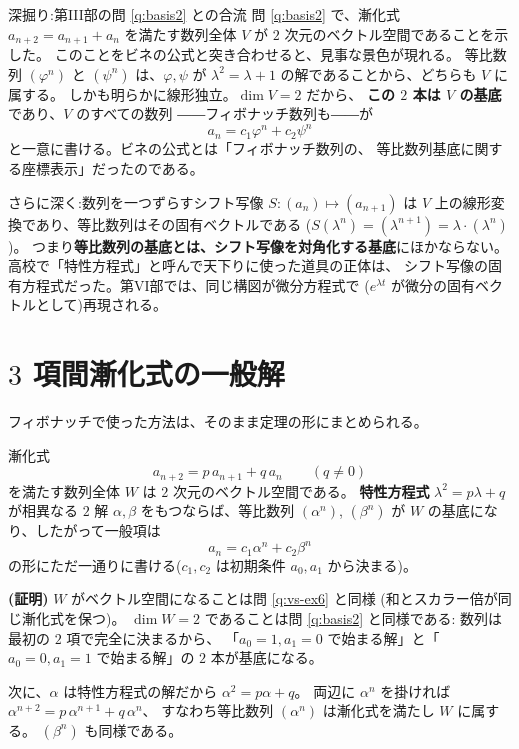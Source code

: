 \begin{itembox}[l]{深掘り:第III部の問 \ref{q:basis2} との合流}
問 \ref{q:basis2} で、漸化式 $a_{n+2} = a_{n+1} + a_n$ を満たす数列全体 $V$ が
$2$ 次元のベクトル空間であることを示した。
このことをビネの公式と突き合わせると、見事な景色が現れる。
等比数列 $(\varphi^n)$ と $(\psi^n)$ は、$\varphi, \psi$ が
$\lambda^2 = \lambda + 1$ の解であることから、どちらも $V$ に属する。
しかも明らかに線形独立。$\dim V = 2$ だから、
\textbf{この $2$ 本は $V$ の基底}であり、$V$ のすべての数列
――フィボナッチ数列も――が
\[
a_n = c_1 \varphi^n + c_2 \psi^n
\]
と一意に書ける。ビネの公式とは「フィボナッチ数列の、
等比数列基底に関する座標表示」だったのである。

さらに深く:数列を一つずらすシフト写像 $S : (a_n) \mapsto (a_{n+1})$ は
$V$ 上の線形変換であり、等比数列はその固有ベクトルである
($S(\lambda^n) = (\lambda^{n+1}) = \lambda \cdot (\lambda^n)$)。
つまり\textbf{等比数列の基底とは、シフト写像を対角化する基底}にほかならない。
高校で「特性方程式」と呼んで天下りに使った道具の正体は、
シフト写像の固有方程式だった。第VI部では、同じ構図が微分方程式で
($e^{\lambda t}$ が微分の固有ベクトルとして)再現される。
\end{itembox}

\section{$3$ 項間漸化式の一般解}

フィボナッチで使った方法は、そのまま定理の形にまとめられる。

\begin{teiri}[$3$ 項間漸化式の一般項]\label{thm:power-rec}
漸化式
\[
a_{n+2} = p\,a_{n+1} + q\,a_n \qquad (q \neq 0)
\]
を満たす数列全体 $W$ は $2$ 次元のベクトル空間である。
\textbf{特性方程式} $\lambda^2 = p\lambda + q$ が相異なる $2$ 解
$\alpha, \beta$ をもつならば、等比数列 $(\alpha^n)$, $(\beta^n)$ が
$W$ の基底になり、したがって一般項は
\[
a_n = c_1 \alpha^n + c_2 \beta^n
\]
の形にただ一通りに書ける($c_1, c_2$ は初期条件 $a_0, a_1$ から決まる)。
\end{teiri}

\noindent\textbf{(証明)}\quad
$W$ がベクトル空間になることは問 \ref{q:vs-ex6} と同様
(和とスカラー倍が同じ漸化式を保つ)。
$\dim W = 2$ であることは問 \ref{q:basis2} と同様である:
数列は最初の $2$ 項で完全に決まるから、
「$a_0 = 1, a_1 = 0$ で始まる解」と「$a_0 = 0, a_1 = 1$ で始まる解」の
$2$ 本が基底になる。

次に、$\alpha$ は特性方程式の解だから $\alpha^2 = p\alpha + q$。
両辺に $\alpha^n$ を掛ければ
$\alpha^{n+2} = p\,\alpha^{n+1} + q\,\alpha^n$、
すなわち等比数列 $(\alpha^n)$ は漸化式を満たし $W$ に属する。
$(\beta^n)$ も同様である。

